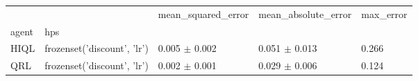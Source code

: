 \begin{tabular}{lllll}
\toprule
 &  & mean_squared_error & mean_absolute_error & max_error \\
agent & hps &  &  &  \\
\midrule
HIQL & frozenset({'discount', 'lr'}) & 0.005 $\pm$ 0.002 & 0.051 $\pm$ 0.013 & 0.266 \\
\cline{1-5}
QRL & frozenset({'discount', 'lr'}) & 0.002 $\pm$ 0.001 & 0.029 $\pm$ 0.006 & 0.124 \\
\cline{1-5}
\bottomrule
\end{tabular}

